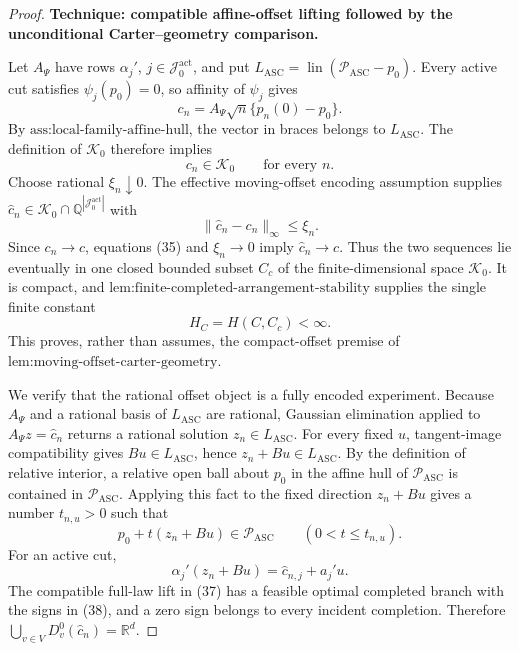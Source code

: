 \documentclass{article}
\begin{document}
\begin{proof}
\textbf{Technique: compatible affine-offset lifting followed by the unconditional Carter--geometry comparison.}

Let \(A_\Psi\) have rows \(\alpha_j'\), \(j\in\mathcal J_0^{\mathrm{act}}\), and put \(L_{\mathrm{ASC}}=\operatorname{lin}(\mathcal P_{\mathrm{ASC}}-p_0)\).  Every active cut satisfies \(\psi_j(p_0)=0\), so affinity of \(\psi_j\) gives
\[
 c_n=A_\Psi\sqrt n\{p_n(0)-p_0\}.
 \tag{33}
\]
By \(\text{ass:local-family-affine-hull}\), the vector in braces belongs to \(L_{\mathrm{ASC}}\).  The definition of \(\mathcal K_0\) therefore implies
\[
 c_n\in\mathcal K_0\qquad\text{for every }n.
 \tag{34}
\]
Choose rational \(\xi_n\downarrow0\).  The effective moving-offset encoding assumption supplies \(\widehat c_n\in\mathcal K_0\cap\mathbb Q^{|\mathcal J_0^{\mathrm{act}}|}\) with
\[
 \|\widehat c_n-c_n\|_\infty\le\xi_n.
 \tag{35}
\]
Since \(c_n\to c\), equations (35) and \(\xi_n\to0\) imply \(\widehat c_n\to c\).  Thus the two sequences lie eventually in one closed bounded subset \(C_c\) of the finite-dimensional space \(\mathcal K_0\).  It is compact, and \(\text{lem:finite-completed-arrangement-stability}\) supplies the single finite constant
\[
 H_C=H(C,C_c)<\infty.
 \tag{36}
\]
This proves, rather than assumes, the compact-offset premise of \(\text{lem:moving-offset-carter-geometry}\).

We verify that the rational offset object is a fully encoded experiment.  Because \(A_\Psi\) and a rational basis of \(L_{\mathrm{ASC}}\) are rational, Gaussian elimination applied to \(A_\Psi z=\widehat c_n\) returns a rational solution \(z_n\in L_{\mathrm{ASC}}\).  For every fixed \(u\), tangent-image compatibility gives \(Bu\in L_{\mathrm{ASC}}\), hence \(z_n+Bu\in L_{\mathrm{ASC}}\).  By the definition of relative interior, a relative open ball about \(p_0\) in the affine hull of \(\mathcal P_{\mathrm{ASC}}\) is contained in \(\mathcal P_{\mathrm{ASC}}\).  Applying this fact to the fixed direction \(z_n+Bu\) gives a number \(t_{n,u}>0\) such that
\[
 p_0+t(z_n+Bu)\in\mathcal P_{\mathrm{ASC}}
 \qquad(0<t\le t_{n,u}).
 \tag{37}
\]
For an active cut,
\[
 \alpha_j'(z_n+Bu)=\widehat c_{n,j}+a_j'u.
 \tag{38}
\]
The compatible full-law lift in (37) has a feasible optimal completed branch with the signs in (38), and a zero sign belongs to every incident completion.  Therefore \(\bigcup_{v\in V}D_v^0(\widehat c_n)=\mathbb R^d\).


\end{proof}
\end{document}
